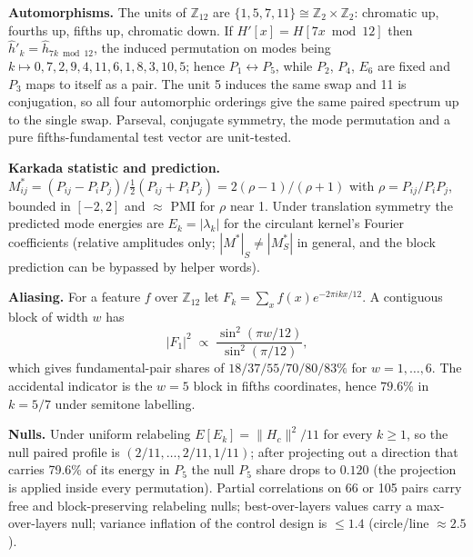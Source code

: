 \documentclass[11pt]{article}
\begin{document}

\textbf{Automorphisms.} The units of $\mathbb{Z}_{12}$ are $\{1,5,7,11\}\cong\mathbb{Z}_2\times\mathbb{Z}_2$: chromatic up, fourths up, fifths up, chromatic down. If $H'[x]=H[7x \bmod 12]$ then $\hat h'_k=\hat h_{7k \bmod 12}$, the induced permutation on modes being $k\mapsto 0,7,2,9,4,11,6,1,8,3,10,5$; hence $P_1\leftrightarrow P_5$, while $P_2$, $P_4$, $E_6$ are fixed and $P_3$ maps to itself as a pair. The unit 5 induces the same swap and 11 is conjugation, so all four automorphic orderings give the same paired spectrum up to the single swap. Parseval, conjugate symmetry, the mode permutation and a pure fifths-fundamental test vector are unit-tested.

\textbf{Karkada statistic and prediction.} $M^*_{ij}=(P_{ij}-P_iP_j)/\tfrac12(P_{ij}+P_iP_j)=2(\rho-1)/(\rho+1)$ with $\rho=P_{ij}/P_iP_j$, bounded in $[-2,2]$ and $\approx$ PMI for $\rho$ near 1. Under translation symmetry the predicted mode energies are $E_k=|\lambda_k|$ for the circulant kernel's Fourier coefficients (relative amplitudes only; $|M^*|_S\neq|M^*_S|$ in general, and the block prediction can be bypassed by helper words).

\textbf{Aliasing.} For a feature $f$ over $\mathbb{Z}_{12}$ let $F_k=\sum_x f(x)e^{-2\pi ikx/12}$. A contiguous block of width $w$ has
\[ |F_1|^2 \;\propto\; \frac{\sin^2(\pi w/12)}{\sin^2(\pi/12)}, \]
which gives fundamental-pair shares of $18/37/55/70/80/83\%$ for $w=1,\dots,6$. The accidental indicator is the $w=5$ block in fifths coordinates, hence $79.6\%$ in $k=5/7$ under semitone labelling.

\textbf{Nulls.} Under uniform relabeling $E[E_k]=\|H_c\|^2/11$ for every $k\ge1$, so the null paired profile is $(2/11,\ldots,2/11,1/11)$; after projecting out a direction that carries 79.6\% of its energy in $P_5$ the null $P_5$ share drops to $0.120$ (the projection is applied inside every permutation). Partial correlations on 66 or 105 pairs carry free and block-preserving relabeling nulls; best-over-layers values carry a max-over-layers null; variance inflation of the control design is $\le1.4$ (circle/line $\approx2.5$).

\end{document}
